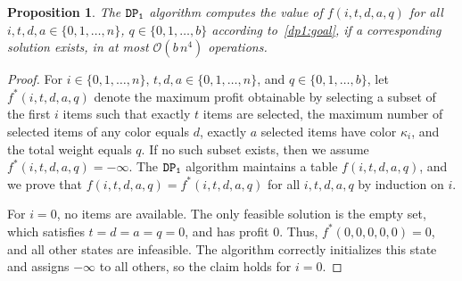 \documentclass[10pt,a4paper]{amsart}
\newtheorem{proposition}{Proposition}
\newcommand{\capacity}{b}
\newcommand{\firstDP}{{\tt DP_1}}
\begin{document}
\begin{proposition}
The $\firstDP$ algorithm computes the value of $f(i,t,d,a,q)$ for all $i,t,d,a \in \{0,1,\dots,n\}$, $q \in \{0,1,\dots, \capacity\}$ according to~\eqref{dp1:goal}, if a corresponding solution exists, in at most $\mathcal{O}(\capacity \, n^4)$ operations.
\end{proposition}

\begin{proof}
For $i \in \{0,1,\dots,n\}$, $t,d,a \in \{0,1,\dots,n\}$, and $q \in \{0,1,\dots,\capacity\}$, let $f^*(i,t,d,a,q)$ denote the maximum profit obtainable by selecting a subset of the first $i$ items such that exactly $t$ items are selected, the maximum number of selected items of any color equals $d$, exactly $a$ selected items have color $\kappa_i$, and the total weight equals $q$.
If no such subset exists, then we assume $f^*(i,t,d,a,q) = -\infty$.
The $\firstDP$ algorithm maintains a table $f(i,t,d,a,q)$, and we prove that $f(i,t,d,a,q) = f^*(i,t,d,a,q)$ for all $i,t,d,a,q$ by induction on $i$.

\smallskip

For $i=0$, no items are available. The only feasible solution is the empty set, which satisfies $t=d=a=q=0$, and has profit $0$. 
Thus, $f^*(0,0,0,0,0) = 0$, and all other states are infeasible. The algorithm correctly initializes this state and assigns $-\infty$ to all others, so the claim holds for $i=0$.

\smallskip


\end{proof}
\end{document}

